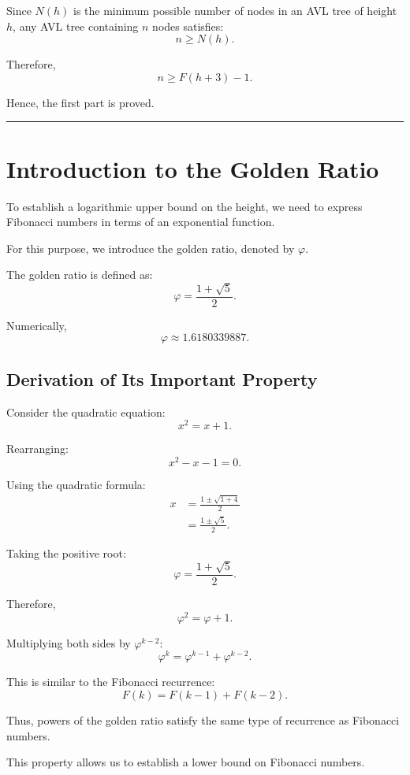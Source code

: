 \documentclass[11pt,a4paper]{article}
\begin{document}
Since $N(h)$ is the minimum possible number of nodes in an AVL tree of height $h$, any AVL tree containing $n$ nodes satisfies:
\[
  n \ge N(h).
\]

Therefore,
\[
  \boxed{n \ge F(h+3) - 1.}
\]

Hence, the first part is proved.

\medskip
\hrule
\medskip

\section{Introduction to the Golden Ratio}

To establish a logarithmic upper bound on the height, we need to express Fibonacci numbers in terms of an exponential function.

For this purpose, we introduce the golden ratio, denoted by $\varphi$.

The golden ratio is defined as:
\[
  \varphi = \frac{1 + \sqrt{5}}{2}.
\]

Numerically,
\[
  \varphi \approx 1.6180339887.
\]

\subsection*{Derivation of Its Important Property}

Consider the quadratic equation:
\[
  x^2 = x + 1.
\]

Rearranging:
\[
  x^2 - x - 1 = 0.
\]

Using the quadratic formula:
\begin{align*}
  x &= \frac{1 \pm \sqrt{1+4}}{2}\\
    &= \frac{1 \pm \sqrt{5}}{2}.
\end{align*}

Taking the positive root:
\[
  \varphi = \frac{1 + \sqrt{5}}{2}.
\]

Therefore,
\[
  \boxed{\varphi^2 = \varphi + 1.}
\]

Multiplying both sides by $\varphi^{k-2}$:
\[
  \varphi^{k} = \varphi^{k-1} + \varphi^{k-2}.
\]

This is similar to the Fibonacci recurrence:
\[
  F(k) = F(k-1) + F(k-2).
\]

Thus, powers of the golden ratio satisfy the same type of recurrence as Fibonacci numbers.

This property allows us to establish a lower bound on Fibonacci numbers.
\end{document}

